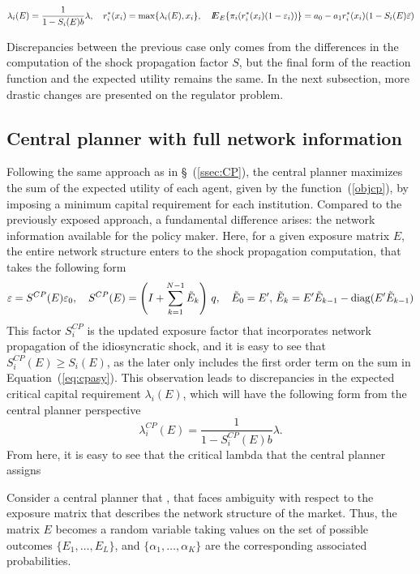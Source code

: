 \[\lambda_i(E)= \frac{1}{1-S_i(E)b}\lambda,\quad r_i^*(x_i) = \max\{\lambda_i(E),x_i\},\quad \Ex_E\{\pi_i(r_i^*(x_i)(1-\epsilon_i))\}=a_0-a_1r_i^*(x_i)(1-S_i(E)\bar\epsilon)\]

Discrepancies between the previous case only comes from the differences in the computation of the shock propagation factor \(S\), but the final form of the reaction function and the expected utility remains the same.  In the next subsection, more drastic changes are presented on the regulator problem.

\subsection{Central planner with full network information}
Following the same approach as in \S~(\ref{ssec:CP}), the central planner maximizes the sum of the expected utility of each agent, given by the function~(\ref{objcp}), by imposing a minimum capital requirement for each institution. Compared to the previously exposed approach, a fundamental difference arises: the network information available for the policy maker.  Here, for a given exposure matrix \(E\), the entire network structure enters to the shock propagation computation, that takes the following form
\begin{equation}\label{eq:cpasy}
\epsilon = S^{CP}(E)\epsilon_0,\quad S^{CP}(E)=\left(I+\sum_{k=1}^{N-1}\tilde{E}_k\right)\,q,\quad \tilde{E}_0=E',\,\tilde{E}_k=E'\tilde{E}_{k-1}-{\rm diag}(E'\tilde{E}_{k-1})
\end{equation}
This factor $S^{CP}_i$ is the updated exposure factor that incorporates network propagation of the idiosyncratic shock, and it is easy to see that $S^{CP}_i(E)\geq S_i(E)$, as the later only includes the first order term on the sum in Equation~(\ref{eq:cpasy}).  This observation leads to discrepancies in the expected critical capital requirement $\lambda_i(E)$, which will have the following form from the central planner perspective
\[\lambda_i^{CP}(E)= \frac{1}{1-S_i^{CP}(E)b}\lambda.\]
From here, it is easy to see that the critical lambda that the central planner assigns 

Consider a central planner that , that faces ambiguity with respect to the exposure matrix that describes the network structure of the market.  Thus, the matrix \(E\) becomes a random variable taking values on the set of possible outcomes \(\{E_1,\ldots,E_L\}\), and \(\{\alpha_1,\ldots,\alpha_K\}\) are the corresponding associated probabilities.


